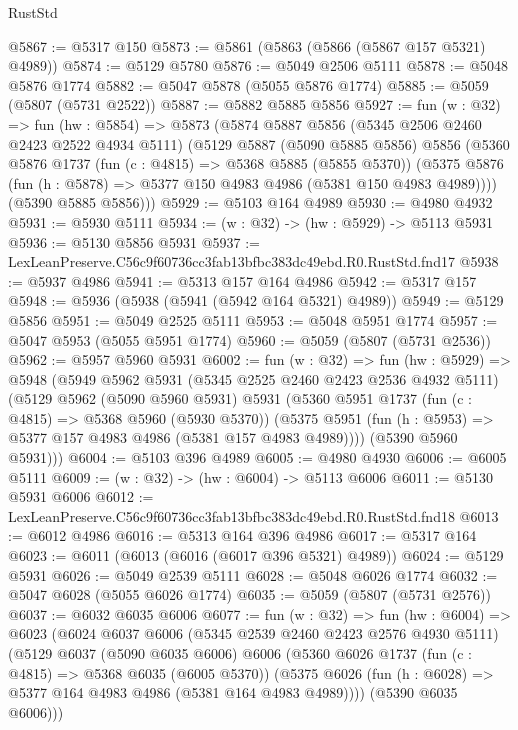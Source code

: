 \begin{lexlean}{RustStd}
\begin{coremodule}
@5867 := @5317 @150
@5873 := @5861 (@5863 (@5866 (@5867 @157 @5321) @4989))
@5874 := @5129 @5780
@5876 := @5049 @2506 @5111
@5878 := @5048 @5876 @1774
@5882 := @5047 @5878 (@5055 @5876 @1774)
@5885 := @5059 (@5807 (@5731 @2522))
@5887 := @5882 @5885 @5856
@5927 := fun (w : @32) =>
  fun (hw : @5854) =>
  @5873
    (@5874
      @5887
      @5856
      (@5345 @2506 @2460 @2423 @2522 @4934 @5111)
      (@5129
        @5887
        (@5090 @5885 @5856)
        @5856
        (@5360
          @5876
          @1737
          (fun (c : @4815) => @5368 @5885 (@5855 @5370))
          (@5375 @5876 (fun (h : @5878) => @5377 @150 @4983 @4986 (@5381 @150 @4983 @4989))))
        (@5390 @5885 @5856)))
@5929 := @5103 @164 @4989
@5930 := @4980 @4932
@5931 := @5930 @5111
@5934 := (w : @32) -> (hw : @5929) -> @5113 @5931
@5936 := @5130 @5856 @5931
@5937 := LexLeanPreserve.C56c9f60736cc3fab13bfbc383dc49ebd.R0.RustStd.fnd17
@5938 := @5937 @4986
@5941 := @5313 @157 @164 @4986
@5942 := @5317 @157
@5948 := @5936 (@5938 (@5941 (@5942 @164 @5321) @4989))
@5949 := @5129 @5856
@5951 := @5049 @2525 @5111
@5953 := @5048 @5951 @1774
@5957 := @5047 @5953 (@5055 @5951 @1774)
@5960 := @5059 (@5807 (@5731 @2536))
@5962 := @5957 @5960 @5931
@6002 := fun (w : @32) =>
  fun (hw : @5929) =>
  @5948
    (@5949
      @5962
      @5931
      (@5345 @2525 @2460 @2423 @2536 @4932 @5111)
      (@5129
        @5962
        (@5090 @5960 @5931)
        @5931
        (@5360
          @5951
          @1737
          (fun (c : @4815) => @5368 @5960 (@5930 @5370))
          (@5375 @5951 (fun (h : @5953) => @5377 @157 @4983 @4986 (@5381 @157 @4983 @4989))))
        (@5390 @5960 @5931)))
@6004 := @5103 @396 @4989
@6005 := @4980 @4930
@6006 := @6005 @5111
@6009 := (w : @32) -> (hw : @6004) -> @5113 @6006
@6011 := @5130 @5931 @6006
@6012 := LexLeanPreserve.C56c9f60736cc3fab13bfbc383dc49ebd.R0.RustStd.fnd18
@6013 := @6012 @4986
@6016 := @5313 @164 @396 @4986
@6017 := @5317 @164
@6023 := @6011 (@6013 (@6016 (@6017 @396 @5321) @4989))
@6024 := @5129 @5931
@6026 := @5049 @2539 @5111
@6028 := @5048 @6026 @1774
@6032 := @5047 @6028 (@5055 @6026 @1774)
@6035 := @5059 (@5807 (@5731 @2576))
@6037 := @6032 @6035 @6006
@6077 := fun (w : @32) =>
  fun (hw : @6004) =>
  @6023
    (@6024
      @6037
      @6006
      (@5345 @2539 @2460 @2423 @2576 @4930 @5111)
      (@5129
        @6037
        (@5090 @6035 @6006)
        @6006
        (@5360
          @6026
          @1737
          (fun (c : @4815) => @5368 @6035 (@6005 @5370))
          (@5375 @6026 (fun (h : @6028) => @5377 @164 @4983 @4986 (@5381 @164 @4983 @4989))))
        (@5390 @6035 @6006)))

\end{coremodule}
\end{lexlean}
